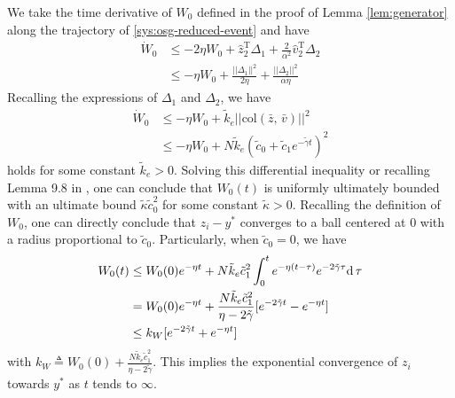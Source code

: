 \documentclass[sort&compress]{IEEEtran}
\renewcommand{\top}{{\mathrm{T}}}
\begin{document}
We take the time derivative of $W_0$  defined in the proof of Lemma \ref{lem:generator} along the trajectory of \eqref{sys:osg-reduced-event} and have 
\begin{align*}
	\dot{W}_0&\leq -2\eta W_0+\hat z_2^\top \Delta_1+\frac{2}{\alpha^2}\hat v_2^\top \Delta_2\\
	&\leq -\eta W_0+\frac{||\Delta_1||^2}{2\eta}+\frac{||\Delta_2||^2}{ \alpha \eta}
\end{align*}
Recalling the expressions of $\Delta_1$ and $\Delta_2$, we have 
\begin{align*}
	\dot{W}_0& \leq -\eta W_0+ \tilde k_e||\mbox{col}(\bar z,\,\bar v)||^2\\
	& \leq -\eta W_0+ N \tilde k_e(\tilde c_0+\tilde c_1e^{-\tilde \gamma t})^2
\end{align*}
holds for some constant $\tilde k_e>0$. Solving this differential inequality or recalling Lemma 9.8 in \cite{khalil2002nonlinear}, one can conclude that $W_0(t)$ is uniformly ultimately bounded with an ultimate bound $\tilde \kappa \tilde c_0^2$ for some constant $\tilde \kappa>0$. Recalling the definition of $W_0$, one can directly conclude that $z_i-y^*$ converges to a ball centered at $0$ with a radius proportional to $\tilde c_0$. Particularly, when $\tilde c_0=0$, we have 
\begin{align}\label{eq:lem-event-generator-W}
	W_0(t)&\leq W_0(0)e^{-\eta t}+  N \tilde k_e \tilde c_1^2 \int_{0}^t e^{-\eta(t-\tau)} e^{-2\tilde \gamma \tau} {\rm d}\,\tau \nonumber\\
	& = W_0(0)e^{-\eta t}+  \frac{N \tilde k_e \tilde c_1^2}{\eta- 2\tilde \gamma} [e^{-2\tilde \gamma t}-e^{-\eta t}] \nonumber\\
	&\leq k_{W} [e^{-2\tilde \gamma t}+e^{-\eta t}]
\end{align}
with $k_{W} \triangleq W_0(0) + \frac{N \tilde k_e \tilde c_1^2}{\eta- 2\tilde \gamma}  $. This implies  the exponential convergence of $z_i$ towards $y^*$ as $t$ tends to $\infty$. 
\end{document}
